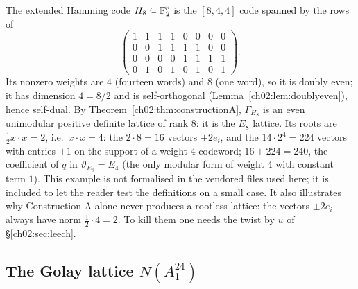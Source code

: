 \begin{example}\label{ch02:ex:e8}
The extended Hamming code $H_8\subseteq\mathbb{F}_2^8$ is the $[8,4,4]$ code spanned by the rows of
\begin{equation*}
\begin{pmatrix}
1&1&1&1&0&0&0&0\\ 0&0&1&1&1&1&0&0\\ 0&0&0&0&1&1&1&1\\ 0&1&0&1&0&1&0&1
\end{pmatrix}.
\end{equation*}
Its nonzero weights are $4$ (fourteen words) and $8$ (one word), so it is doubly even; it has
dimension $4=8/2$ and is self-orthogonal (Lemma~\ref{ch02:lem:doublyeven}), hence self-dual.  By
Theorem~\ref{ch02:thm:constructionA}, $\Gamma_{H_8}$ is an even unimodular positive definite
lattice of rank $8$: it is the $E_8$ lattice.  Its roots are $\tfrac12x\cdot x=2$, i.e.\ $x\cdot
x=4$: the $2\cdot8=16$ vectors $\pm2e_i$, and the $14\cdot2^4=224$ vectors with entries $\pm1$ on
the support of a weight-$4$ codeword; $16+224=240$, the coefficient of $q$ in $\vartheta_{E_8}=E_4$
(the only modular form of weight $4$ with constant term $1$).  This example is not formalised in
the vendored files used here; it is included to let the reader test the definitions on a small
case.  It also illustrates why Construction A alone never produces a rootless lattice: the
vectors $\pm2e_i$ always have norm $\tfrac12\cdot4=2$.  To kill them one needs the twist by $u$ of
\S\ref{ch02:sec:leech}.
\end{example}

\subsection{\texorpdfstring{The Golay lattice $N(A_1^{24})$}{The Golay lattice N(A1^24)}}\label{ch02:sec:golaylattice}

